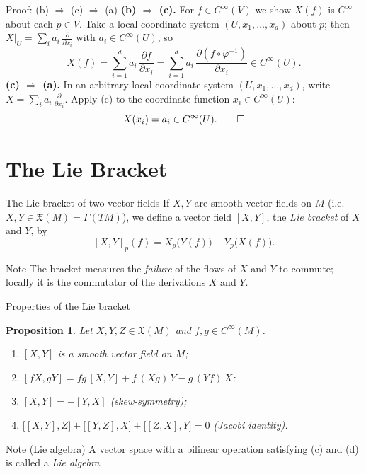 \documentclass[10pt]{beamer}
\newtheorem{proposition}{Proposition}
\newcommand{\vX}{\mathfrak{X}}
\begin{document}
\begin{frame}{Proof: (b) $\Rightarrow$ (c) $\Rightarrow$ (a)}
	\textbf{(b) $\Rightarrow$ (c).} For $f \in C^\infty(V)$ we show
	$X(f)$ is $C^\infty$ about each $p \in V$. Take a local coordinate
	system $(U, x_1, \dots, x_d)$ about $p$; then
	$X\big|_U = \sum_i a_i\, \frac{\partial}{\partial x_i}$ with
	$a_i \in C^\infty(U)$, so
	\[
		X(f) = \sum_{i=1}^{d} a_i\, \frac{\partial f}{\partial x_i}
		= \sum_{i=1}^{d} a_i\,
		\frac{\partial (f \circ \varphi^{-1})}{\partial x_i}
		\in C^\infty(U).
	\]
	\textbf{(c) $\Rightarrow$ (a).} In an arbitrary local coordinate
	system $(U, x_1, \dots, x_d)$, write
	$X = \sum_i a_i\, \frac{\partial}{\partial x_i}$. Apply (c) to the
	coordinate function $x_i \in C^\infty(U)$:
	\[
		X(x_i) = a_i \in C^\infty(U). \qedhere
	\]
\end{frame}

\section{The Lie Bracket}

\begin{frame}{The Lie bracket of two vector fields}
	If $X, Y$ are smooth vector fields on $M$ (i.e.\ $X, Y \in
		\vX(M) = \Gamma(TM)$), we define a vector field $[X, Y]$,
	the \emph{Lie bracket} of $X$ and $Y$, by
	\[
		[X, Y]_p(f) = X_p\bigl(Y(f)\bigr) - Y_p\bigl(X(f)\bigr).
	\]
	\medskip
	\begin{block}{Note}
		The bracket measures the \emph{failure} of the flows of $X$ and
		$Y$ to commute; locally it is the commutator of the derivations
		$X$ and $Y$.
	\end{block}
\end{frame}

\begin{frame}{Properties of the Lie bracket}
	\begin{proposition}
		Let $X, Y, Z \in \vX(M)$ and $f, g \in C^\infty(M)$.
		\begin{enumerate}
			\item[(a)] $[X, Y]$ is a smooth vector field on $M$;
			\item[(b)] $[fX, gY] = fg\,[X, Y] + f\,(Xg)\, Y
				      - g\,(Yf)\, X$;
			\item[(c)] $[X, Y] = -[Y, X]$
			      \emph{(skew-symmetry)};
			\item[(d)] $\bigl[[X, Y], Z\bigr] + \bigl[[Y, Z], X\bigr]
				      + \bigl[[Z, X], Y\bigr] = 0$
			      \emph{(Jacobi identity)}.
		\end{enumerate}
	\end{proposition}
	\begin{block}{Note (Lie algebra)}
		A vector space with a bilinear operation satisfying (c) and (d)
		is called a \emph{Lie algebra}.
	\end{block}
\end{frame}
\end{document}
